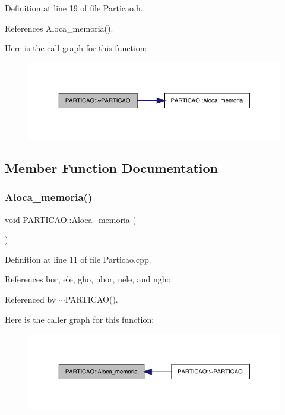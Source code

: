 Definition at line 19 of file Particao.\+h.



References Aloca\+\_\+memoria().

Here is the call graph for this function\+:
\nopagebreak
\begin{figure}[H]
\begin{center}
\leavevmode
\includegraphics[width=329pt]{structPARTICAO_a66ddff2bfc683b115de034fd56fd1457_cgraph}
\end{center}
\end{figure}


\subsection{Member Function Documentation}
\mbox{\label{structPARTICAO_aef22e80bae9b273f319d73b39931c713}} 
\subsubsection{\texorpdfstring{Aloca\+\_\+memoria()}{Aloca\_memoria()}}
{\footnotesize\ttfamily void P\+A\+R\+T\+I\+C\+A\+O\+::\+Aloca\+\_\+memoria (\begin{DoxyParamCaption}{ }\end{DoxyParamCaption})}



Definition at line 11 of file Particao.\+cpp.



References bor, ele, gho, nbor, nele, and ngho.



Referenced by $\sim$\+P\+A\+R\+T\+I\+C\+A\+O().

Here is the caller graph for this function\+:
\nopagebreak
\begin{figure}[H]
\begin{center}
\leavevmode
\includegraphics[width=329pt]{structPARTICAO_aef22e80bae9b273f319d73b39931c713_icgraph}
\end{center}
\end{figure}


